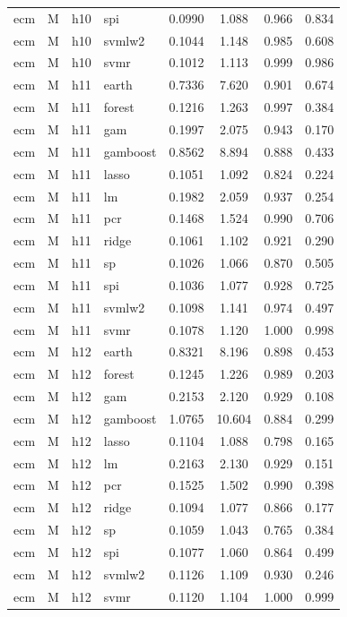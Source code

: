 \begin{ThreePartTable}
\begin{longtable}[t]{llclcccc}
ecm & M & h10 & spi & 0.0990 & 1.088 & 0.966 & 0.834\\
ecm & M & h10 & svmlw2 & 0.1044 & 1.148 & 0.985 & 0.608\\
ecm & M & h10 & svmr & 0.1012 & 1.113 & 0.999 & 0.986\\
\addlinespace
ecm & M & h11 & earth & 0.7336 & 7.620 & 0.901 & 0.674\\
ecm & M & h11 & forest & 0.1216 & 1.263 & 0.997 & 0.384\\
ecm & M & h11 & gam & 0.1997 & 2.075 & 0.943 & 0.170\\
ecm & M & h11 & gamboost & 0.8562 & 8.894 & 0.888 & 0.433\\
ecm & M & h11 & lasso & 0.1051 & 1.092 & 0.824 & 0.224\\
ecm & M & h11 & lm & 0.1982 & 2.059 & 0.937 & 0.254\\
ecm & M & h11 & pcr & 0.1468 & 1.524 & 0.990 & 0.706\\
ecm & M & h11 & ridge & 0.1061 & 1.102 & 0.921 & 0.290\\
ecm & M & h11 & sp & 0.1026 & 1.066 & 0.870 & 0.505\\
ecm & M & h11 & spi & 0.1036 & 1.077 & 0.928 & 0.725\\
ecm & M & h11 & svmlw2 & 0.1098 & 1.141 & 0.974 & 0.497\\
ecm & M & h11 & svmr & 0.1078 & 1.120 & 1.000 & 0.998\\
\addlinespace
ecm & M & h12 & earth & 0.8321 & 8.196 & 0.898 & 0.453\\
ecm & M & h12 & forest & 0.1245 & 1.226 & 0.989 & 0.203\\
ecm & M & h12 & gam & 0.2153 & 2.120 & 0.929 & 0.108\\
ecm & M & h12 & gamboost & 1.0765 & 10.604 & 0.884 & 0.299\\
ecm & M & h12 & lasso & 0.1104 & 1.088 & 0.798 & 0.165\\
ecm & M & h12 & lm & 0.2163 & 2.130 & 0.929 & 0.151\\
ecm & M & h12 & pcr & 0.1525 & 1.502 & 0.990 & 0.398\\
ecm & M & h12 & ridge & 0.1094 & 1.077 & 0.866 & 0.177\\
ecm & M & h12 & sp & 0.1059 & 1.043 & 0.765 & 0.384\\
ecm & M & h12 & spi & 0.1077 & 1.060 & 0.864 & 0.499\\
ecm & M & h12 & svmlw2 & 0.1126 & 1.109 & 0.930 & 0.246\\
ecm & M & h12 & svmr & 0.1120 & 1.104 & 1.000 & 0.999\\

\end{longtable}
\end{ThreePartTable}
